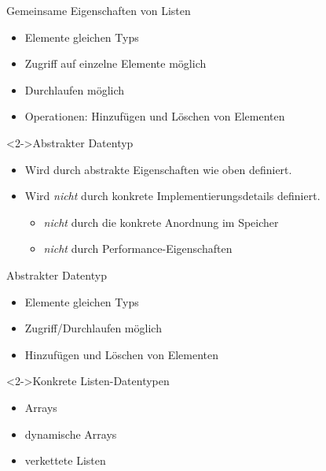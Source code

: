 \begin{frame}
    \begin{block}{Gemeinsame Eigenschaften von Listen}
        \begin{itemize}
            \item Elemente gleichen Typs
            \item Zugriff auf einzelne Elemente möglich
            \item Durchlaufen möglich
            \item Operationen: Hinzufügen und Löschen von Elementen
        \end{itemize}
    \end{block}

    \begin{block}<2->{Abstrakter Datentyp }
        \begin{itemize}
            \item Wird durch abstrakte Eigenschaften wie oben definiert.
            \item Wird \emph{nicht} durch konkrete Implementierungsdetails definiert.
            \begin{itemize}
                \item \emph{nicht} durch die konkrete Anordnung im Speicher
                \item \emph{nicht} durch Performance-Eigenschaften
            \end{itemize}
        \end{itemize}
    \end{block}
\end{frame}

\begin{frame}
    \begin{block}{Abstrakter Datentyp }
        \begin{itemize}
            \item Elemente gleichen Typs
            \item Zugriff/Durchlaufen möglich
            \item Hinzufügen und Löschen von Elementen
        \end{itemize}
    \end{block}

    \begin{block}<2->{Konkrete Listen-Datentypen}
        \begin{itemize}
            \item Arrays
            \item dynamische Arrays
            \item verkettete Listen
        \end{itemize}
    \end{block}
\end{frame}

